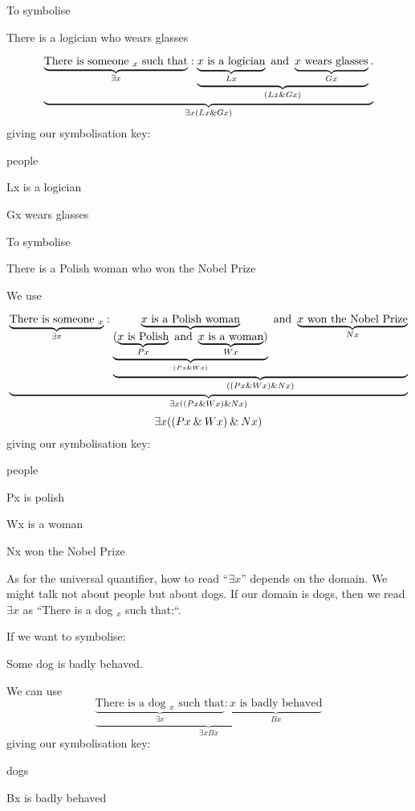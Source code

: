 To symbolise 
\begin{earg}
\item[\ex{q.e}] There is a logician who wears glasses
\end{earg}
$$\underbrace{\underbrace{\text{There is someone $_x$ such that}}_{\exists x}: \underbrace{\underbrace{\text{$x$ is a logician}}_{Lx}\text{ and }\underbrace{\text{$x$ wears glasses}}_{Gx}}_{(Lx\mathbin{\&} Gx)}.}_{\exists x(Lx\mathbin{\&} Gx)}$$
giving our symbolisation key:
\begin{ekey}
\item[\text{domain}] people
\item[Lx] is a logician
\item[Gx] wears glasses
\end{ekey}

To symbolise 
\begin{earg}
\item[\ex{q.e}] There is a Polish woman who won the Nobel Prize
\end{earg}
We use

$$
\underbrace{	
	\underbrace{\text{There is someone $_x$}}_{\exists x}:
	\underbrace{
		\underbrace{\text{$x$ is a Polish woman}}_{
			\underbrace{(\underbrace{\text{$x$ is Polish}}_{Px}
			\text{ and }
			\underbrace{\text{$x$ is a woman}}_{Wx}
			)}_{(Px\mathbin{\&} Wx)}
			}
		\text{ and }
		\underbrace{\text{$x$ won the Nobel Prize}}_{Nx}
	}_{((Px\mathbin{\&} Wx)\mathbin{\&} Nx)}
}_{\exists x((Px\mathbin{\&} Wx)\mathbin{\&} Nx)}
$$
$$\exists x((Px\mathbin{\&} Wx)\mathbin{\&} Nx)$$
giving our symbolisation key:
\begin{ekey}
\item[\text{domain}] people
\item[Px] is polish
\item[Wx] is a woman
\item[Nx] won the Nobel Prize
\end{ekey}


As for the universal quantifier, how to read ``$\exists x$'' depends on the domain. We might talk not about people but about dogs. If our domain is dogs, then we read $\exists x$ as ``There is a dog $_x$ such that:``. 

If we want to symbolise:
\begin{earg}
\item[\ex{q.dog}] Some dog is badly behaved.
\end{earg}
We can use
$$\underbrace{\underbrace{\text{There is a dog $_x$ such that}}_{\exists x}: \underbrace{\text{$x$ is badly behaved}}_{Bx}}_{\exists xBx}$$
giving our symbolisation key:
\begin{ekey}
\item[\text{domain}] dogs
\item[Bx] is badly behaved
\end{ekey}

